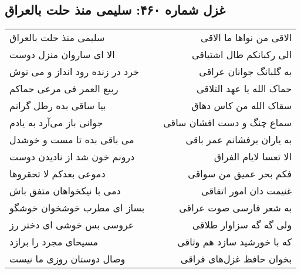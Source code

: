 \begin{center}
\section*{غزل شماره ۴۶۰: سلیمی منذ حلت بالعراق}
\label{sec:sh460}
\begin{longtable}{l p{0.5cm} r}
سلیمی منذ حلت بالعراق
&&
الاقی من نواها ما الاقی
\\
الا ای ساروان منزل دوست
&&
الی رکبانکم طال اشتیاقی
\\
خرد در زنده رود انداز و می نوش
&&
به گلبانگ جوانان عراقی
\\
ربیع العمر فی مرعی حماکم
&&
حماک الله یا عهد التلاقی
\\
بیا ساقی بده رطل گرانم
&&
سقاک الله من کاس دهاق
\\
جوانی باز می‌آرد به یادم
&&
سماع چنگ و دست افشان ساقی
\\
می باقی بده تا مست و خوشدل
&&
به یاران برفشانم عمر باقی
\\
درونم خون شد از نادیدن دوست
&&
الا تعسا لایام الفراق
\\
دموعی بعدکم لا تحقروها
&&
فکم بحر عمیق من سواقی
\\
دمی با نیکخواهان متفق باش
&&
غنیمت دان امور اتفاقی
\\
بساز ای مطرب خوشخوان خوشگو
&&
به شعر فارسی صوت عراقی
\\
عروسی بس خوشی ای دختر رز
&&
ولی گه گه سزاوار طلاقی
\\
مسیحای مجرد را برازد
&&
که با خورشید سازد هم وثاقی
\\
وصال دوستان روزی ما نیست
&&
بخوان حافظ غزل‌های فراقی
\\
\end{longtable}
\end{center}
